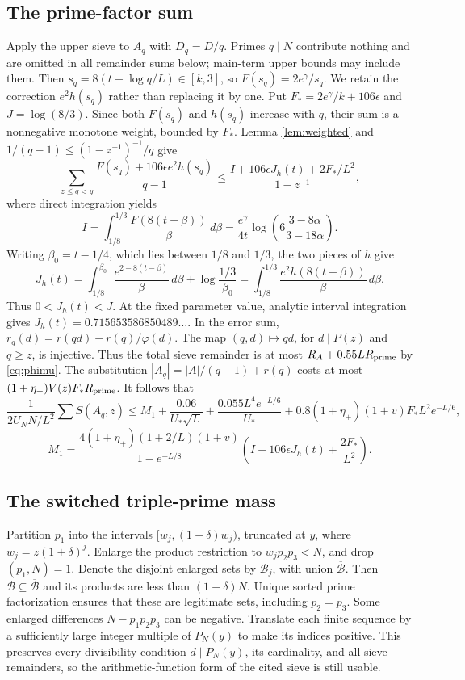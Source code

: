 \documentclass[11pt]{article}
\newcommand{\Th}{U_NN/L^2}
\begin{document}
\subsection{The prime-factor sum}
Apply the upper sieve to $A_q$ with $D_q=D/q$.
Primes $q\mid N$ contribute nothing and are omitted in all remainder
sums below; main-term upper bounds may include them.
Then $s_q=8(t-\log q/L)\in[k,3]$, so $F(s_q)=2e^\gamma/s_q$.
We retain the correction $e^2h(s_q)$ rather than replacing it by one.
Put $F_*=2e^\gamma/k+106\epsilon$ and $J=\log(8/3)$.
Since both $F(s_q)$ and $h(s_q)$ increase with $q$, their sum is a
nonnegative monotone weight, bounded by $F_*$.
Lemma \ref{lem:weighted} and
$1/(q-1)\le (1-z^{-1})^{-1}/q$ give
\[
\sum_{z\le q<y}\frac{F(s_q)+106\epsilon e^2h(s_q)}{q-1}
\le\frac{I+106\epsilon J_h(t)+2F_*/L^2}{1-z^{-1}},
\]
where direct integration yields
\[
I=\int_{1/8}^{1/3}\frac{F(8(t-\beta))}{\beta}\,d\beta
=\frac{e^\gamma}{4t}\log\left(6\frac{3-8\alpha}{3-18\alpha}\right).
\]
Writing $\beta_0=t-1/4$, which lies between $1/8$ and $1/3$,
the two pieces of $h$ give
\begin{equation}\label{eq:Jh}
J_h(t)=\int_{1/8}^{\beta_0}\frac{e^{2-8(t-\beta)}}{\beta}\,d\beta
+\log\frac{1/3}{\beta_0}
=\int_{1/8}^{1/3}\frac{e^2h(8(t-\beta))}{\beta}\,d\beta.
\end{equation}
Thus $0<J_h(t)<J$. At the fixed parameter value, analytic interval
integration gives $J_h(t)=0.715653586850489\ldots$.
In the error sum, $r_q(d)=r(qd)-r(q)/\varphi(d)$.
The map $(q,d)\mapsto qd$, for $d\mid P(z)$ and $q\ge z$,
is injective. Thus the total sieve remainder is at most
$R_A+0.55L R_{\rm prime}$ by \eqref{eq:phimu}. The substitution
$|A_q|=|A|/(q-1)+r(q)$ costs at most
$(1+\eta_+)V(z)F_*R_{\rm prime}$. It follows that
\begin{equation}\label{eq:upper}
\frac{1}{2\Th}\sum S(A_q,z)\le M_1+
\frac{0.06}{U_*\sqrt L}
+\frac{0.055L^4e^{-L/6}}{U_*}
+0.8(1+\eta_+)(1+v)F_*L^2e^{-L/6},
\end{equation}
\[
M_1=\frac{4(1+\eta_+)(1+2/L)(1+v)}{1-e^{-L/8}}
\left(I+106\epsilon J_h(t)+\frac{2F_*}{L^2}\right).
\]

\subsection{The switched triple-prime mass}
Partition $p_1$ into the intervals $[w_j,(1+\delta)w_j)$, truncated
at $y$, where $w_j=z(1+\delta)^j$. Enlarge the product restriction
to $w_jp_2p_3<N$, and drop $(p_1,N)=1$. Denote the disjoint enlarged
sets by $\mathcal B_j$, with union $\overline{\mathcal B}$.
Then $\mathcal B\subseteq\overline{\mathcal B}$ and its products
are less than $(1+\delta)N$. Unique sorted prime factorization
ensures that these are legitimate sets, including $p_2=p_3$.
Some enlarged differences $N-p_1p_2p_3$ can be negative. Translate
each finite sequence by a sufficiently large integer multiple of
$P_N(y)$ to make its indices positive. This preserves every divisibility
condition $d\mid P_N(y)$, its cardinality, and all sieve remainders,
so the arithmetic-function form of the cited sieve is still usable.
\end{document}
